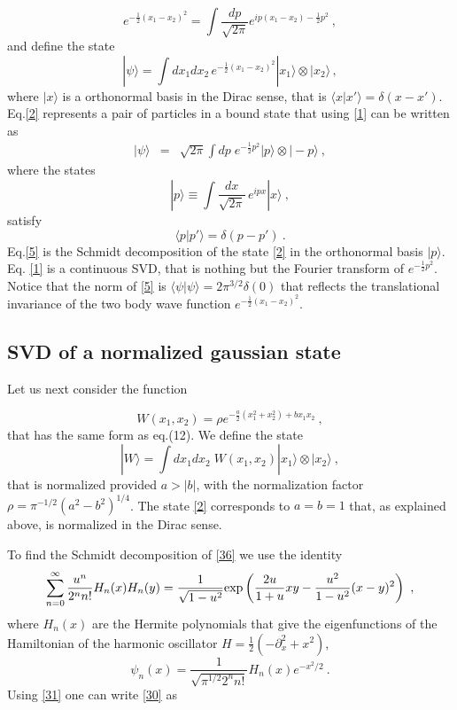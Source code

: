 \documentclass[a4paper,preprintnumbers,nofootinbib,twocolumn]{quantumarticle}
\def\barray{\begin{eqnarray}}
\def\earray{\end{eqnarray}}
\def\beq{\begin{equation}}
\def\eeq{\end{equation}}
\begin{document}
\beq
e^{ - \frac{1}{2} (x_1 - x_2)^2} = \int \frac{dp}{ \sqrt{2 \pi}} e^{ i p( x_1 - x_2) - \frac{1}{2} p^2}  \ , 
\label{1}
\eeq
and define the state
\beq
| \psi \rangle = \int dx_1 dx_2 \, e^{ - \frac{1}{2} (x_1 - x_2)^2}  |x_1 \rangle \otimes |x_2 \rangle \, , 
\label{2}
\eeq
where $|x \rangle$ is a orthonormal basis in the Dirac sense, that is 
$\langle x |x' \rangle = \delta(x - x')$.  Eq.\eqref{2} represents a pair of particles
in a bound state that using \eqref{1} can be written as 
\barray 
| \psi \rangle & =  &    \sqrt{2 \pi} \int dp  \;  e^{ - \frac{1}{2} p^2}  |p \rangle \otimes |-p \rangle \ , 
\label{5}
\earray
where the states 
\beq
| p \rangle \equiv 
\int \frac{dx}{\sqrt{2 \pi}}  \, e^{ i p x}  |x \rangle \ , 
\label{6}
\eeq
satisfy
\beq
\langle p | p' \rangle = \delta( p - p') \ . 
\label{7}
\eeq
Eq.\eqref{5} is the Schmidt decomposition of the state \eqref{2} in  the 
orthonormal basis $| p \rangle$. Eq. \eqref{1} is a continuous SVD,  that is nothing but the Fourier transform 
of $e^{ - \frac{1}{2} p^2}$.  Notice that the norm of  \eqref{5} is $\langle \psi |\psi \rangle = 2 \pi^{3/2} \delta(0)$
that reflects the translational invariance of the two body wave function $e^{ - \frac{1}{2} (x_1 - x_2)^2}$. 


\subsection{SVD of a normalized gaussian state}

Let us next consider the function 

\beq
W(x_1, x_2) = \rho  e^{ - \frac{a}{2} (x_1^2 + x_2^2) + b x_1 x_2} \ , 
\label{29}
\eeq
that has the same form as eq.(12).  We define the state 
\beq
| W \rangle = \int dx_1  dx_2  \;  W(x_1,x_2) |x_1 \rangle \otimes | x_2 \rangle \ , 
\label{36}
\eeq
that is normalized provided $a > |b|$,  with the normalization factor $\rho =  \pi^{- 1/2} (a^2 - b^2)^{ 1/4}$. 
The state \eqref{2} corresponds to $a=b=1$ that, as explained above, is normalized in the Dirac sense. 

To find the Schmidt decomposition of \eqref{36} we use the identity  \cite{A70} 
\beq
\sum_{n=0}^\infty \frac{u^n }{2^n n!} H_n(x) H_n(y)  = \frac{ 1}{ \sqrt{1- u^2}}  {\rm exp} \left(  \frac{ 2 u}{ 1 + u} x y  - 
\frac{u^2}{ 1 - u^2} ( x - y)^2 \right)  \ , 
\label{30}
\eeq
where $H_n(x)$ are the Hermite polynomials that give the eigenfunctions of the
Hamiltonian of the  harmonic oscillator $H = \frac{1}{2} ( - \partial_x^2 + x^2)$, 
\beq
\psi_n(x) = \frac{1}{ \sqrt{ \pi^{1/2} 2^n n!}} H_n(x) e^{ - x^2/2}  \ . 
\label{31}
\eeq
Using \eqref{31} one can write \eqref{30} as
\end{document}
